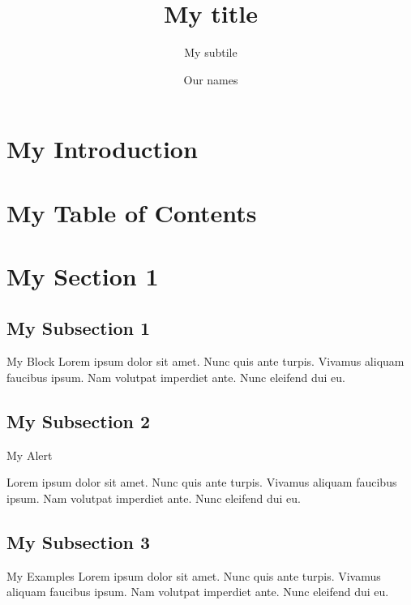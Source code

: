 \documentclass[12pt]{beamer}
\author{Our names}
\title{My title}
\subtitle{My subtile}
\begin{document}
\section{My Introduction}
{
  {
  }

  \begin{frame}
    \titlepage
  \end{frame}
}


\section{My Table of Contents}
\begin{frame}
  \tableofcontents
\end{frame}


\section{My Section 1}
\subsection{My Subsection 1}
\begin{frame}
  \begin{block}{My Block}
Lorem ipsum dolor sit amet. Nunc quis ante turpis. Vivamus aliquam faucibus ipsum. Nam volutpat imperdiet ante. Nunc eleifend dui eu.
  \end{block}
\end{frame}

\subsection{My Subsection 2}
\begin{frame}
  \begin{alertblock}{My Alert}

    \begin{alert}{Lorem ipsum dolor sit amet.}
 Nunc quis ante turpis. Vivamus aliquam faucibus ipsum. Nam volutpat imperdiet ante. Nunc eleifend dui eu.
    \end{alert}
  \end{alertblock}
\end{frame}

\subsection{My Subsection 3}
\begin{frame}
  \begin{exampleblock}{My Examples}
Lorem ipsum dolor sit amet. Nunc quis ante turpis. Vivamus aliquam faucibus ipsum. Nam volutpat imperdiet ante. Nunc eleifend dui eu.
  \end{exampleblock}
\end{frame}
\end{document}
